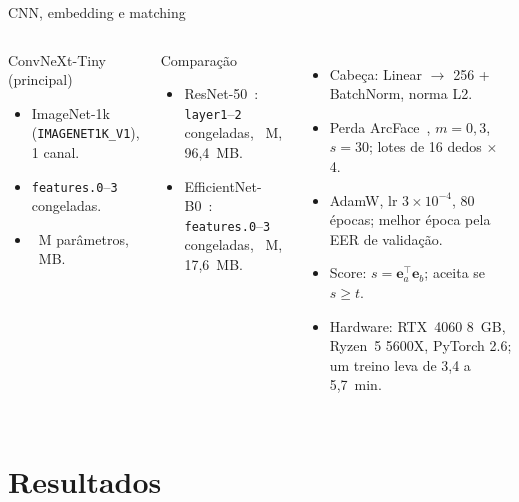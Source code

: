 \documentclass[
  aspectratio = 169,
  10pt,
  t,
  onlytextwidth,
  compress,
  handout,
  xcolor = table,
  english,
  brazilian,
]{beamer}
\begin{document}
\begin{frame}{CNN, embedding e matching}
\begin{columns}[T]
\begin{block}{ConvNeXt-Tiny~\cite{liu2022convnext} (principal)}
\begin{itemize}
\item ImageNet-1k (\texttt{IMAGENET1K\_V1}), 1 canal.
\item \texttt{features.0}--\texttt{3} congeladas.
\item \cnxParams~M parâmetros, \cnxSize~MB.
\end{itemize}
\end{block}
\begin{block}{Comparação}
\begin{itemize}
\item ResNet-50~\cite{he2016resnet}: \texttt{layer1}--\texttt{2} congeladas, \rnParams~M, 96,4~MB.
\item EfficientNet-B0~\cite{tan2019efficientnet}: \texttt{features.0}--\texttt{3} congeladas, \effParams~M, 17,6~MB.
\end{itemize}
\end{block}
\begin{itemize}
\item Cabeça: Linear $\rightarrow$ 256 + BatchNorm, norma L2.
\item Perda ArcFace~\cite{deng2019arcface}, $m=0{,}3$, $s=30$; lotes de 16 dedos $\times$ 4.
\item AdamW, lr $3\times10^{-4}$, 80 épocas; melhor época pela EER de validação.
\item Score: $s=\mathbf{e}_a^\top\mathbf{e}_b$; aceita se $s\ge t$.
\item Hardware: RTX~4060 8~GB, Ryzen~5 5600X, PyTorch 2.6; um treino leva de 3,4 a 5,7~min.
\end{itemize}
\end{columns}
\end{frame}

\section{Resultados}
\end{document}
